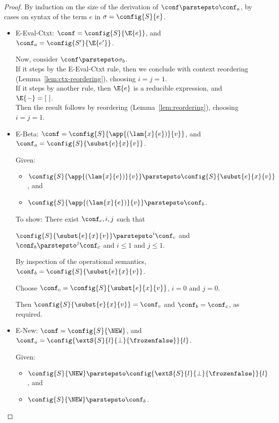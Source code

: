 \begin{proof}

  By induction on the size of the derivation of $\conf \parstepsto \conf_a$, by
  cases on syntax of the term $e$ in $\sigma = \config{S}{e}$. 

  \begin{itemize}
    \item {\sc E-Eval-Ctxt}: $\conf = \config{S}{\E{e}}$, and $\conf_a
      = \config{S'}{\E{e'}}$.

      Now, consider $\conf \parstepsto \sigma_b$. \\ 
      If it steps by the {\sc E-Eval-Ctxt} rule, then we conclude with context reordering (Lemma~\ref{lem:ctx-reordering}), choosing $i = j = 1$. \\
      If it steps by another rule, then $\E{e}$ is a reducible expression, and $\E{-} = [~]$. \\ 
      Then the result follows by reordering (Lemma~\ref{lem:reordering}), choosing $i = j = 1$. 


    \item {\sc E-Beta}: $\conf = \config{S}{\app{(\lam{x}{e})}{v}}$,
      and $\conf_a = \config{S}{\subst{e}{x}{v}}$.

      Given:
      \begin{itemize}
      \item $\config{S}{\app{(\lam{x}{e})}{v}} \parstepsto \config{S}{\subst{e}{x}{v}}$, and
      \item $\config{S}{\app{(\lam{x}{e})}{v}} \parstepsto \conf_b$.
      \end{itemize}

      To show: There exist $\conf_c, i, j$ such that

      $\config{S}{\subst{e}{x}{v}} \parstepsto^i \conf_c$ and $\conf_b
      \parstepsto^j \conf_c$ and $i \leq 1$ and $j \leq 1$.

      By inspection of the operational semantics, $\conf_b =
      \config{S}{\subst{e}{x}{v}}$.

      Choose $\conf_c = \config{S}{\subst{e}{x}{v}}$, $i = 0$ and $j =
      0$.

      Then $\config{S}{\subst{e}{x}{v}} = \conf_c$ and $\conf_b =
      \conf_c$, as required.

    \item {\sc E-New}: $\conf = \config{S}{\NEW}$, and $\conf_a =
      \config{\extS{S}{l}{\bot}{\frozenfalse}}{l}$.

      Given:
      \begin{itemize}
      \item $\config{S}{\NEW} \parstepsto
        \config{\extS{S}{l}{\bot}{\frozenfalse}}{l}$, and
      \item $\config{S}{\NEW} \parstepsto \conf_b$.
      \end{itemize}


\end{itemize}
\end{proof}
